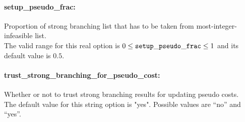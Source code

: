 \paragraph{setup\_pseudo\_frac:}\label{sec:setup_pseudo_frac} Proportion of strong branching list that has to be taken from most-integer-infeasible list. $\;$ \\
 The valid range for this real option is 
$0 \le {\tt setup\_pseudo\_frac } \le 1$
and its default value is $0.5$.


\paragraph{trust\_strong\_branching\_for\_pseudo\_cost:}\label{sec:trust_strong_branching_for_pseudo_cost} Whether or not to trust strong branching results for updating pseudo costs. $\;$ \\
The default value for this string option is "yes".
Possible values are ``no'' and ``yes''.

